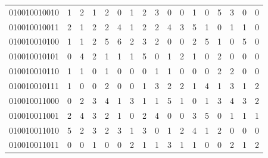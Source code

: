 \documentclass[10pt,a4paper]{article}
\begin{document}
\begin{longtable}{ |c|c|c|c|c|c|c|c|c|c|c|c|c|c|c|c|c| }
    010010010010              & 1                            & 2                                & 1                            & 2                              & 0   & 1   & 2   & 3   & 0   & 0   & 1   & 0   & 5   & 3   & 0   & 0   \\
    010010010011              & 2                            & 1                                & 2                            & 2                              & 4   & 1   & 2   & 2   & 4   & 3   & 5   & 1   & 0   & 1   & 1   & 0   \\
    010010010100              & 1                            & 1                                & 2                            & 5                              & 6   & 2   & 3   & 2   & 0   & 0   & 2   & 5   & 1   & 0   & 5   & 0   \\
    010010010101              & 0                            & 4                                & 2                            & 1                              & 1   & 1   & 5   & 0   & 1   & 2   & 1   & 0   & 2   & 0   & 0   & 0   \\
    010010010110              & 1                            & 1                                & 0                            & 1                              & 0   & 0   & 0   & 1   & 1   & 0   & 0   & 0   & 2   & 2   & 0   & 0   \\
    010010010111              & 1                            & 0                                & 0                            & 2                              & 0   & 0   & 1   & 3   & 2   & 2   & 1   & 4   & 1   & 3   & 1   & 2   \\
    010010011000              & 0                            & 2                                & 3                            & 4                              & 1   & 3   & 1   & 1   & 5   & 1   & 0   & 1   & 3   & 4   & 3   & 2   \\
    010010011001              & 2                            & 4                                & 3                            & 2                              & 1   & 0   & 2   & 4   & 0   & 0   & 3   & 5   & 0   & 1   & 1   & 1   \\
    010010011010              & 5                            & 2                                & 3                            & 2                              & 3   & 1   & 3   & 0   & 1   & 2   & 4   & 1   & 2   & 0   & 0   & 0   \\
    010010011011              & 0                            & 0                                & 1                            & 0                              & 0   & 2   & 1   & 1   & 3   & 1   & 1   & 0   & 0   & 2   & 1   & 2   \\

\end{longtable}
\end{document}
